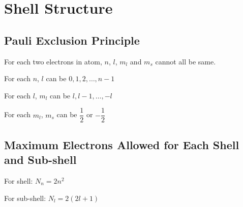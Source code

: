 \chapter{Shell Structure}

\section{Pauli Exclusion Principle}

For each two electrons in atom, $n$, $l$, $m_l$ and $m_s$ cannot all be same.

For each $n$, $l$ can be $0,1,2,\dots,n-1$

For each $l$, $m_l$ can be $l,l-1,\dots,-l$

For each $m_l$, $m_s$ can be $\dfrac{1}{2}$ or $-\dfrac{1}{2} $

\section{Maximum Electrons Allowed for Each Shell and Sub-shell}

For shell: $N_n = 2n^2$

For sub-shell: $N_l = 2 \left( 2l + 1 \right)$


